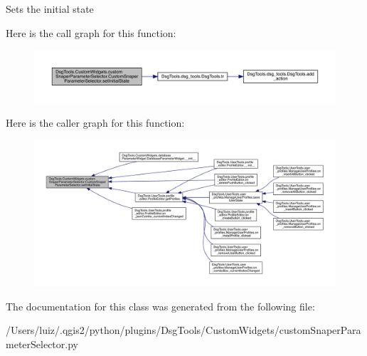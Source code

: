\begin{DoxyVerb}Sets the initial state
\end{DoxyVerb}
 Here is the call graph for this function\+:
\nopagebreak
\begin{figure}[H]
\begin{center}
\leavevmode
\includegraphics[width=350pt]{class_dsg_tools_1_1_custom_widgets_1_1custom_snaper_parameter_selector_1_1_custom_snaper_parameter_selector_a7f9ee4776c0c617b476c6db482f1c671_cgraph}
\end{center}
\end{figure}
Here is the caller graph for this function\+:
\nopagebreak
\begin{figure}[H]
\begin{center}
\leavevmode
\includegraphics[width=350pt]{class_dsg_tools_1_1_custom_widgets_1_1custom_snaper_parameter_selector_1_1_custom_snaper_parameter_selector_a7f9ee4776c0c617b476c6db482f1c671_icgraph}
\end{center}
\end{figure}


The documentation for this class was generated from the following file\+:\begin{DoxyCompactItemize}
\item 
/\+Users/luiz/.\+qgis2/python/plugins/\+Dsg\+Tools/\+Custom\+Widgets/custom\+Snaper\+Parameter\+Selector.\+py\end{DoxyCompactItemize}
